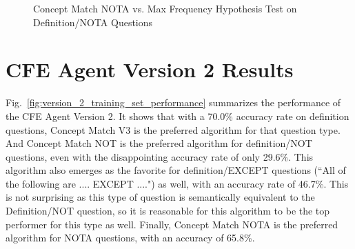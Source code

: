 \begin{figure}
\centering
\vspace{0.75in}
\caption{Concept Match NOTA vs. Max Frequency Hypothesis Test on Definition/NOTA  Questions}
\label{fig:concept_match_nota_hypothesis_test}
\end{figure}





\section{CFE Agent Version 2 Results}

Fig.~\ref{fig:version_2_training_set_performance} summarizes the performance of the CFE Agent Version 2.  It shows that with a 70.0\% accuracy rate on definition questions, Concept Match V3 is the preferred algorithm for that question type.  And Concept Match NOT is the preferred algorithm for definition/NOT questions, even with the disappointing accuracy rate of only  29.6\%.  This algorithm also emerges as the favorite for definition/EXCEPT questions (``All of the following are .... EXCEPT ....") as well, with an accuracy rate of 46.7\%.  This is not surprising as this type of question is semantically equivalent to the Definition/NOT question, so it is reasonable for this algorithm to be the top performer for this type as well.  Finally, Concept Match NOTA is the preferred algorithm for NOTA questions, with an accuracy of 65.8\%.


